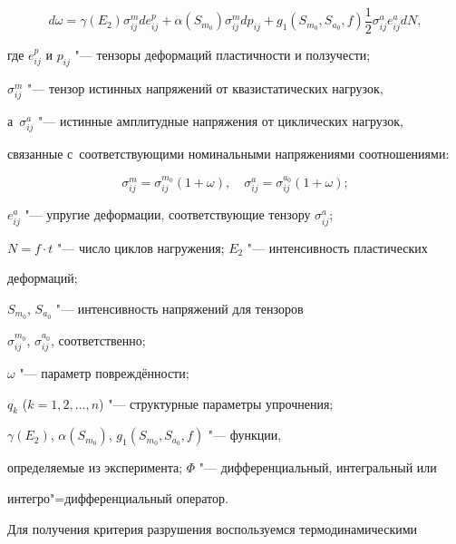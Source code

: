 \begin{equation}

 \label{kichaev:eq3}

d\omega =\gamma (E_2 )\sigma_{ij}^m de_{ij}^p +

\alpha (S_{m_0 }) \sigma _{ij}^m dp_{ij} +

g_1 (S_{m_0}, S_{a_0}, f) \frac 12\sigma _{ij}^a e_{ij}^a dN,

\end{equation}

где $e_{ij}^p $ и $p_{ij} $ "--- тензоры деформаций пластичности и ползучести; 

$\sigma _{ij}^m $ "--- тензор истинных напряжений от квазистатических нагрузок, 

а~$\sigma _{ij}^a $ "--- истинные амплитудные напряжения от циклических нагрузок, 

связанные с~соответствующими номинальными напряжениями соотношениями:

\begin{equation}

\sigma _{ij}^m =\sigma _{ij}^{m_0 } (1+\omega ),

\quad 

\sigma _{ij}^a =\sigma _{ij}^{a_0 } (1+\omega );

\end{equation}

$e_{ij}^a $ "--- упругие деформации, соответствующие тензору $\sigma _{ij}^a$; 

$N=f\cdot t$ "--- число циклов нагружения; $E_2 $ "--- интенсивность пластических 

деформаций; 

$S_{m_0 } $, $S_{a_0 } $ "--- интенсивность напряжений для тензоров 

$\sigma _{ij}^{m_0 } $, $\sigma _{ij}^{a_0 } $, соответственно; 

$\omega $ "--- параметр повреждённости; 

$q_k$ ($k=1, 2, \dots, n$) "--- структурные  параметры уп\-роч\-не\-ния; 

$\gamma (E_2 )$, $\alpha (S_{m_0})$, $g_1 (S_{m_0 }, S_{a_0 }, f)$ "--- функции, 

определяемые из эксперимента; $\Phi $ "--- дифференциальный, интегральный или 

интегро"=дифференциальный оператор.



Для получения критерия разрушения воспользуемся термодинамическими 

